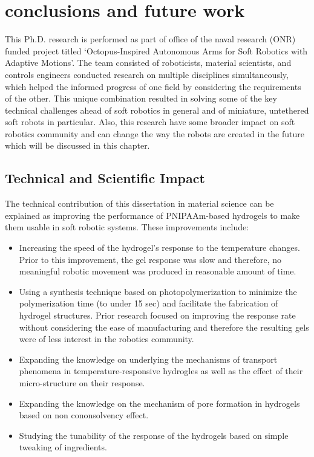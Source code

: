\chapter{conclusions and future work}
\label{chap:conclusion}
This Ph.D. research is performed as part of office of the naval research (ONR) funded project titled `Octopus-Inspired Autonomous Arms for Soft Robotics with Adaptive Motions'. The team consisted of roboticists, material scientists, and controls engineers conducted research on multiple disciplines simultaneously, which helped the informed progress of one field by considering the requirements of the other. This unique combination resulted in solving some of the key technical challenges ahead of soft robotics in general and of miniature, untethered soft robots in particular. Also, this research have some broader impact on soft robotics community and can change the way the robots are created in the future which will be discussed in this chapter.
\section{Technical and Scientific Impact}
The technical contribution of this dissertation in material science can be explained as improving the performance of PNIPAAm-based hydrogels to make them usable in soft robotic systems. These improvements include:
\begin{itemize}
 \item Increasing the speed of the hydrogel's response to the temperature changes. Prior to this improvement, the gel response was slow and therefore, no meaningful robotic movement was produced in reasonable amount of time. 
 \item Using a synthesis technique based on photopolymerization to minimize the polymerization time (to under 15 sec) and facilitate the fabrication of hydrogel structures. Prior research focused on improving the response rate without considering the ease of manufacturing and therefore the resulting gels were of less interest in the robotics community.
 \item Expanding the knowledge on underlying the mechanisms of transport phenomena in temperature-responsive hydrogles as well as the effect of their micro-structure on their response. 
 \item Expanding the knowledge on the mechanism of pore formation in hydrogels based on non cononsolvency effect. 
 \item Studying the tunability of the response of the hydrogels based on simple tweaking of ingredients. 
\end{itemize}
	
